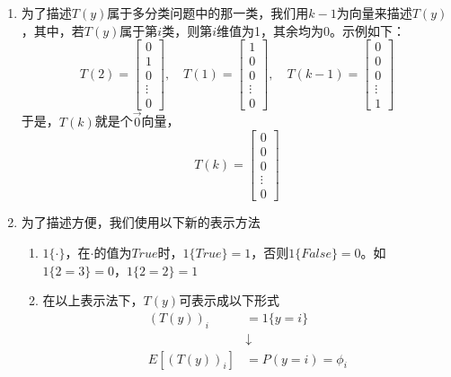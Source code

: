 \begin{enumerate}
	\item 为了描述$T(y)$属于多分类问题中的那一类，我们用$k-1$为向量来描述$T(y)$，其中，若$T(y)$属于第$i$类，则第$i$维值为1，其余均为0。示例如下：
	\begin{equation}
		T(2) = \left[\begin{matrix} 0 \\ 1 \\ 0 \\ \vdots \\ 0 \end{matrix}\right], \quad
		T(1) = \left[\begin{matrix} 1 \\ 0 \\ 0 \\ \vdots \\ 0 \end{matrix}\right], \quad 
		T(k-1) = \left[\begin{matrix} 0 \\ 0 \\ 0 \\ \vdots \\ 1 \end{matrix}\right]
	\end{equation}
	于是，$T(k)$就是个$\vec{0}$向量，
	\begin{equation}
		T(k) = \left[\begin{matrix} 0 \\ 0 \\ 0 \\ \vdots \\ 0 \end{matrix}\right]
	\end{equation}
	\item 为了描述方便，我们使用以下新的表示方法
	\begin{enumerate}
		\item $1\{\cdot\}$，在$\cdot$的值为$True$时，$1\{True\}=1$，否则$1\{False\}=0$。如$1\{2=3\}=0$，$1\{2=2\}=1$
		\item 在以上表示法下，$T(y)$可表示成以下形式
		\begin{align}
			\left(T(y)\right)_i &= 1\{y=i\} \\
			& \downarrow \\
			E\left[\left(T(y)\right)_i\right] &= P(y=i)=\phi_i
		\end{align}
	\end{enumerate}
\end{enumerate}

